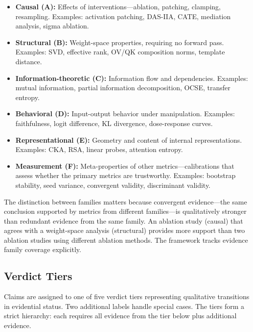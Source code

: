 \documentclass[10pt]{article}
\begin{document}
\begin{itemize}[nosep]
    \item \textbf{Causal (A):} Effects of interventions---ablation, patching, clamping, resampling. Examples: activation patching, DAS-IIA, CATE, mediation analysis, sigma ablation.
    \item \textbf{Structural (B):} Weight-space properties, requiring no forward pass. Examples: SVD, effective rank, OV/QK composition norms, template distance.
    \item \textbf{Information-theoretic (C):} Information flow and dependencies. Examples: mutual information, partial information decomposition, OCSE, transfer entropy.
    \item \textbf{Behavioral (D):} Input-output behavior under manipulation. Examples: faithfulness, logit difference, KL divergence, dose-response curves.
    \item \textbf{Representational (E):} Geometry and content of internal representations. Examples: CKA, RSA, linear probes, attention entropy.
    \item \textbf{Measurement (F):} Meta-properties of other metrics---calibrations that assess whether the primary metrics are trustworthy. Examples: bootstrap stability, seed variance, convergent validity, discriminant validity.
\end{itemize}

The distinction between families matters because convergent evidence---the same conclusion supported by metrics from different families---is qualitatively stronger than redundant evidence from the same family. An ablation study (causal) that agrees with a weight-space analysis (structural) provides more support than two ablation studies using different ablation methods. The framework tracks evidence family coverage explicitly.

\subsection{Verdict Tiers}
\label{sec:verdict-tiers}

Claims are assigned to one of five verdict tiers representing qualitative transitions in evidential status. Two additional labels handle special cases. The tiers form a strict hierarchy: each requires all evidence from the tier below plus additional evidence.
\end{document}
